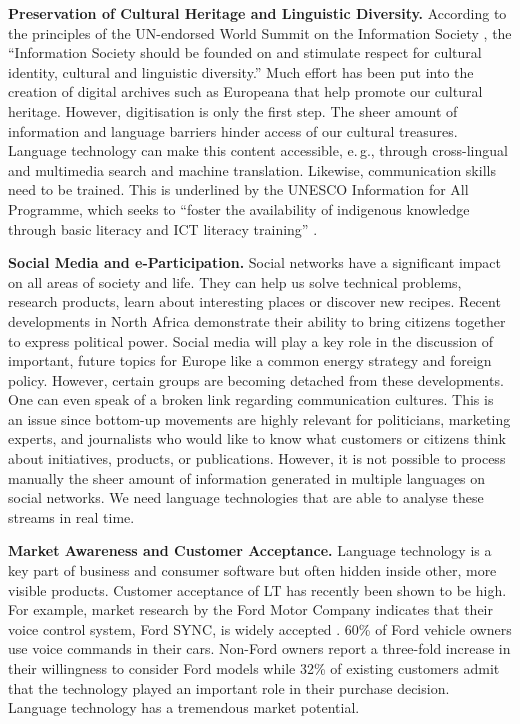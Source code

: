 \documentclass[10pt, plain]{../../metanetpaper}
\begin{document}
\begin{multicols}{2}
\textbf{Preservation of Cultural Heritage and Linguistic Diversity.} According to the principles of the UN-endorsed World Summit on the Information Society \cite{worldsummit2003}, the “Information Society should be founded on and stimulate respect for cultural identity, cultural and linguistic diversity.” Much effort has been put into the creation of digital archives such as Europeana that help promote our cultural heritage. However, digitisation is only the first step. The sheer amount of information and language barriers hinder access of our cultural treasures. Language technology can make this content accessible, e.\,g., through cross-lingual and multimedia search and machine translation. Likewise, communication skills need to be trained. This is underlined by the UNESCO Information for All Programme, which seeks to “foster the availability of indigenous knowledge through basic literacy and ICT literacy training” \cite{Unesco2}.

\textbf{Social Media and e-Participation.} Social networks have a significant impact on all areas of society and life. They can help us solve technical problems, research products, learn about interesting places or discover new recipes. Recent developments in North Africa demonstrate their ability to bring citizens together to express political power. Social media will play a key role in the discussion of important, future topics for Europe like a common energy strategy and foreign policy. However, certain groups are becoming detached from these developments. One can even speak of a broken link regarding communication cultures. This is an issue since bottom-up movements are highly relevant for politicians, marketing experts, and journalists who would like to know what customers or citizens think about initiatives, products, or publications. However, it is not possible to process manually the sheer amount of information generated in multiple languages on social networks. We need language technologies that are able to analyse these streams in real time.

\textbf{Market Awareness and Customer Acceptance.} Language technology is a key part of business and consumer software but often hidden inside other, more visible products. Customer acceptance of LT has recently been shown to be high. For example, market research by the Ford Motor Company indicates that their voice control system, Ford SYNC, is widely accepted \cite{ford}. 60\% of Ford vehicle owners use voice commands in their cars. Non-Ford owners report a three-fold increase in their willingness to consider Ford models while 32\% of existing customers admit that the technology played an important role in their purchase decision. Language technology has a tremendous market potential.


\end{multicols}
\end{document}
